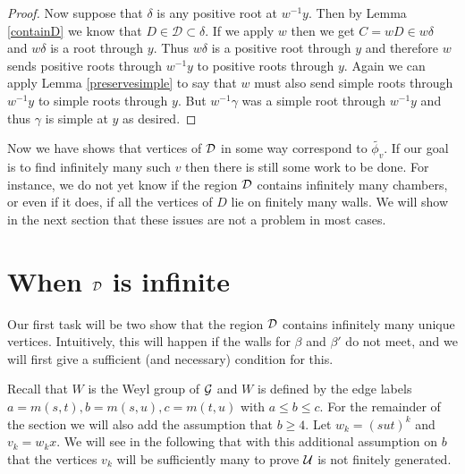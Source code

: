 \documentclass[class=book, crop=false,12 pt]{standalone}
\begin{document}
\begin{proof}
Now suppose that $\delta$ is any positive root at $w^{-1}y.$ Then by Lemma \ref{containD} we know that $D\in \mathcal{D}\subset \delta.$ If we apply $w$ then we get $C=wD\in w\delta$ and $w\delta$ is a root through $y.$ Thus $w\delta$ is a positive root through $y$ and therefore $w$ sends positive roots through $w^{-1}y$ to positive roots through $y.$ Again we can apply Lemma \ref{preservesimple} to say that $w$ must also send simple roots through $w^{-1}y$ to simple roots through $y.$ But $w^{-1}\gamma$ was a simple root through $w^{-1}y$ and thus $\gamma$ is simple at $y$ as desired.
\end{proof}

Now we have shows that vertices of $\mathcal{D}$ in some way correspond to $\tilde{\phi_v}.$ If our goal is to find infinitely many such $v$ then there is still some work to be done. For instance, we do not yet know if the region $\mathcal{D}$ contains infinitely many chambers, or even if it does, if all the vertices of $D$ lie on finitely many walls. We will show in the next section that these issues are not a problem in most cases.


\section{When $\mathcal{D}$ is infinite}
Our first task will be two show that the region $\mathcal{D}$ contains infinitely many unique vertices. Intuitively, this will happen if the walls for $\beta$ and $\beta'$ do not meet, and we will first give a sufficient (and necessary) condition for this.

Recall that $W$ is the Weyl group of $\mathcal{G}$ and $W$ is defined by the edge labels $a=m(s,t),b=m(s,u),c=m(t,u)$ with $a\le b \le c.$ For the remainder of the section we will also add the assumption that $b\ge 4.$ Let $w_k=(sut)^k$ and $v_k=w_kx.$ We will see in the following that with this additional assumption on $b$ that the vertices $v_k$ will be sufficiently many to prove $\mathcal{U}$ is not finitely generated.
\end{document}

